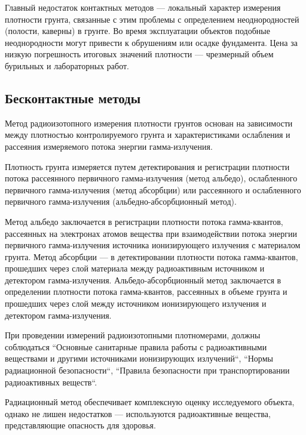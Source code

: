 Главный недостаток контактных методов --- локальный характер измерения плотности грунта, связанные с этим проблемы с определением 
неоднородностей (полости, каверны) в грунте. Во время эксплуатации объектов подобные неоднородности могут привести к обрушениям или осадке фундамента. 
Цена за низкую погрешность итоговых значений плотности --- чрезмерный объем бурильных и лабораторных работ. 

%

\subsection{Бесконтактные методы}\label{subsect1_1_2}

Метод радиоизотопного измерения плотности грунтов основан на зависимости между плотностью контролируемого 
грунта и характеристиками ослабления и рассеяния измеряемого потока энергии гамма-излучения.

Плотность грунта измеряется путем детектирования и регистрации плотности потока рассеянного первичного 
гамма-излучения (метод альбедо), ослабленного первичного гамма-излучения (метод абсорбции) или 
рассеянного и ослабленного первичного гамма-излучения (альбедно-абсорбционный метод).

Метод альбедо заключается в регистрации плотности потока гамма-квантов, рассеянных на электронах атомов 
вещества при взаимодействии потока энергии первичного гамма-излучения источника ионизирующего излучения с материалом грунта.
Метод абсорбции --- в детектировании плотности потока гамма-квантов, прошедших через слой материала 
между радиоактивным источником и детектором гамма-излучения.
Альбедо-абсорбционный метод заключается в определении плотности потока гамма-квантов, рассеянных 
в объеме грунта и прошедших через слой между источником ионизирующего излучения и детектором гамма-излучения.

При проведении измерений радиоизотопными плотномерами, должны соблюдаться ``Основные санитарные правила работы с 
радиоактивными веществами и другими источниками ионизирующих излучений``, ``Нормы радиационной безопасности``, 
``Правила безопасности при транспортировании радиоактивных веществ``.

Радиационный метод обеспечивает комплексную оценку исследуемого объекта, однако не лишен недостатков --- используются
радиоактивные вещества, представляющие опасность для здоровья.


